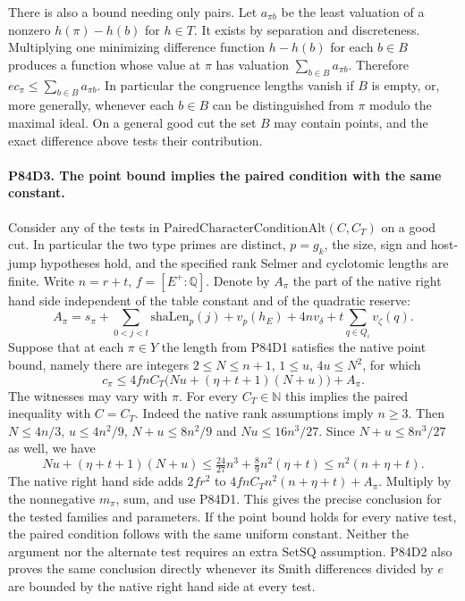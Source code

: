 There is also a bound needing only pairs. Let $a_{\pi b}$ be
the least valuation of a nonzero $h(\pi)-h(b)$ for $h\in T$.
It exists by separation and discreteness. Multiplying one
minimizing difference function $h-h(b)$ for each $b\in B$
produces a function whose value at $\pi$ has valuation
$\sum_{b\in B}a_{\pi b}$. Therefore
$e c_\pi\le\sum_{b\in B}a_{\pi b}$. In particular the
congruence lengths vanish if $B$ is empty, or, more generally,
whenever each $b\in B$ can be distinguished from $\pi$
modulo the maximal ideal. On a general good cut the set $B$
may contain points, and the exact difference above tests their
contribution.

\paragraph{P84D3. The point bound implies the paired condition with the same constant.}
Consider any of the tests in
$\mathrm{PairedCharacterConditionAlt}(C,C_T)$ on a good cut.
In particular the two type primes are distinct, $p=g_k$, the
size, sign and host-jump hypotheses hold, and the specified
rank Selmer and cyclotomic lengths are finite. Write $n=r+t$,
$f=[E^+:\mathbb Q]$. Denote by $A_\pi$ the part of the
native right hand side independent of the table constant and
of the quadratic reserve:
\[
 A_\pi=s_\pi+\sum_{0<j<t}\mathrm{shaLen}_p(j)
        +v_p(h_E)+4n v_\delta+t\sum_{q\in Q_i}v_\zeta(q).
\]
Suppose that at each $\pi\in Y$ the length from P84D1 satisfies
the native point bound, namely there are integers $2\le N\le n+1$,
$1\le u$, $4u\le N^2$, for which
\[
 c_\pi\le 4 f n C_T\bigl(Nu+(\eta+t+1)(N+u)\bigr)+A_\pi .
\]
The witnesses may vary with $\pi$. For every $C_T\in\mathbb N$
this implies the paired inequality with $C=C_T$.
Indeed the native rank assumptions imply $n\ge3$. Then
$N\le4n/3$, $u\le4n^2/9$, $N+u\le8n^2/9$ and
$Nu\le16n^3/27$. Since $N+u\le 8n^3/27$ as well, we have
\[
 Nu+(\eta+t+1)(N+u)
 \le \tfrac{24}{27}n^3+\tfrac89 n^2(\eta+t)
 \le n^2(n+\eta+t).
\]
The native right hand side adds $2fr^2$ to
$4fnC_Tn^2(n+\eta+t)+A_\pi$. Multiply by the
nonnegative $m_\pi$, sum, and use P84D1. This gives the
precise conclusion for the tested families and parameters.
If the point bound holds for every native test, the paired
condition follows with the same uniform constant. Neither
the argument nor the alternate test requires an extra
$\mathrm{SetSQ}$ assumption. P84D2 also proves the same
conclusion directly whenever its Smith differences divided by
$e$ are bounded by the native right hand side at every test.

